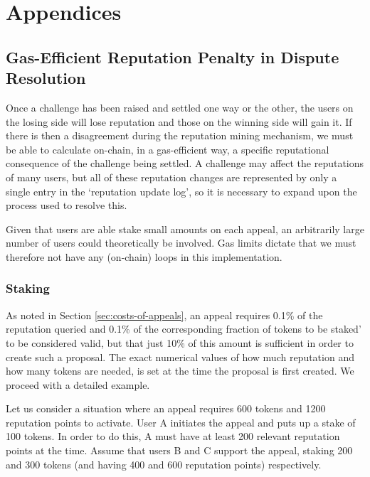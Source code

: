\section{Appendices}

\subsection{Gas-Efficient Reputation Penalty in Dispute Resolution} \label{appendix:rep-transfer}

Once a challenge has been raised and settled one way or the other, the users on the losing side will lose reputation and those on the winning side will gain it. If there is then a disagreement during the reputation mining mechanism, we must be able to calculate on-chain, in a gas-efficient way, a specific reputational consequence of the challenge being settled. A challenge may affect the reputations of many users, but all of these reputation changes are represented by only a single entry in the `reputation update log', so it is necessary to expand upon the process used to resolve this.

Given that users are able stake small amounts on each appeal, an arbitrarily large number of users could theoretically be involved. Gas limits dictate that we must therefore not have any (on-chain) loops in this implementation.

\subsubsection{Staking}

As noted in Section \ref{sec:costs-of-appeals}, an appeal requires 0.1\% of the reputation queried and 0.1\% of the corresponding fraction of tokens to be staked' to be considered valid, but that just 10\% of this amount is sufficient in order to create such a proposal. The exact numerical values of how much reputation and how many tokens are needed, is set at the time the proposal is first created. We proceed with a detailed example.

Let us consider a situation where an appeal requires 600 tokens and 1200 reputation points to activate. User A initiates the appeal and puts up a stake of 100 tokens. In order to do this, A must have at least 200 relevant reputation points at the time. Assume that users B and C support the appeal, staking 200 and 300 tokens (and having 400 and 600 reputation points) respectively.

